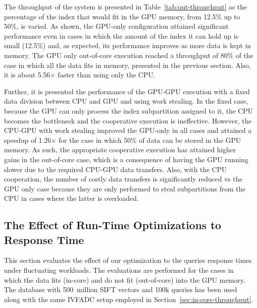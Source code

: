 The throughput of the system is presented in Table~\ref{tab:out-throughput}
as the percentage of the index that would fit in the GPU memory, from 12.5\% up to 50\%,  
 is varied. As shown, the GPU-only configuration attained significant performance
even in cases in which the amount of the index it can hold up is small (12.5\%) and,
as expected, its performance improves as more data is kept in memory. The GPU only
out-of-core execution reached a throughput of 80\% of the case in which
all the data fits in memory, presented in the previous section. Also, it is about 
5.56$\times$ faster than using only the CPU. 


Further, it is presented the performance of the GPU-GPU execution with a fixed 
data division between CPU and GPU and using work stealing. In the fixed case, 
because the GPU can only process the index subpartition assigned to it, 
the CPU becomes the bottleneck and the cooperative execution is ineffective. 
However, the CPU-GPU with work stealing improved the GPU-only in all cases 
and attained a speedup of 1.26$\times$ for the case in which 50\% of data can
be stored in the GPU memory. As such, the appropriate cooperative execution 
has attained higher gains in the out-of-core case, which is a consequence
of having the GPU running slower due to the required CPU-GPU data transfers. Also,
with the CPU cooperation, the number of costly data transfers is significantly reduced vs
the GPU only case because they are only performed to steal subpartitions from 
the CPU in cases where the latter is overloaded.

\subsection{The Effect of Run-Time Optimizations to Response Time}

This section evaluates the effect of our optimization to the queries
response times under fluctuating workloads. The evaluations are
performed for the cases in which the data fits (in-core) and do not fit 
(out-of-core) into the GPU memory. The database with 500~million SIFT vectors 
and 100k queries has been used along with the same IVFADC setup
employed in Section~\ref{sec:in-core-throughput}. 

